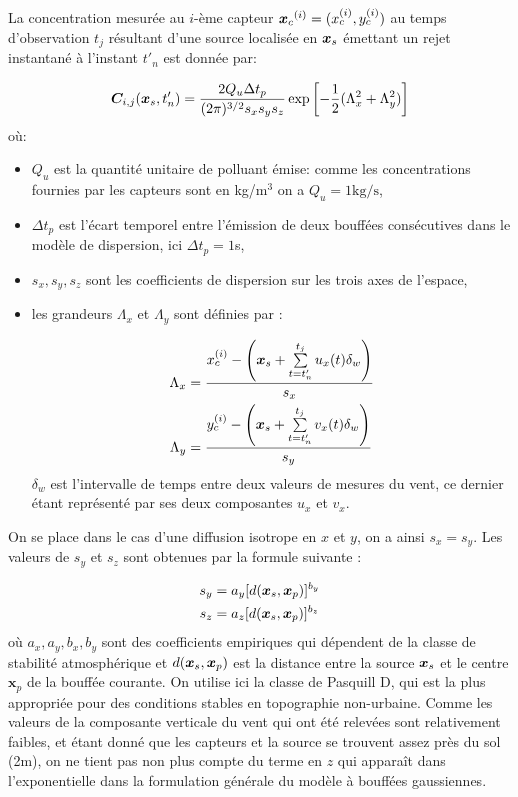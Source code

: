  La concentration mesurée au $i$-ème capteur ${\bm{x}_c}^{(i)} = (x_c^{(i)}, y_c^{(i)})$ au temps d'observation $t_j$ résultant d'une source localisée en ${\bm{x}_s}$ émettant un rejet instantané à l'instant $t'_n$ est donnée par: 
 
 \begin{equation}
 {\bm{C}}_{i,j}({\bm{x}_s}, t'_n) = \dfrac{2Q_u\Delta t_p}{(2\pi)^{3/2}s_x s_y s_z}\exp\left[-\dfrac{1}{2}(\Lambda_x^2 + \Lambda_y^2)\right]
 \label{eq_AE_27}
 \end{equation}
 où:
 \begin{itemize}
 	\item $Q_u$ est la quantité unitaire de polluant émise: comme les concentrations fournies par les capteurs sont en kg/m$^3$ on a $Q_u = 1\text{kg/s}$,
 	\item $\Delta t_p$ est l'écart temporel entre l'émission de deux bouffées consécutives dans le modèle de dispersion, ici $\Delta t_p = 1$s,
 	\item $s_x, s_y, s_z$ sont les coefficients de dispersion sur les trois axes de l'espace,
 	\item les grandeurs $\Lambda_x$ et $\Lambda_y$ sont définies par : 
 	
 	\begin{equation}
 	\begin{split}
 	\Lambda_x &= \dfrac{x_c^{(i)} - \left({\bm{x}_s} + \sum\limits_{t=t'_n}^{t_j}u_x(t)\delta_w\right)}{s_x}\\
 	 	\Lambda_y &= \dfrac{y_c^{(i)} - \left({\bm{x}_s} + \sum\limits_{t=t'_n}^{t_j}v_x(t)\delta_w\right)}{s_y}
 	\end{split}
 	\end{equation}
 	$\delta_w$ est l'intervalle de temps entre deux valeurs de mesures du vent, ce dernier étant représenté par ses deux composantes $u_x$ et $v_x$.
 \end{itemize}
 
 On se place dans le cas d'une diffusion isotrope en $x$ et $y$, on a ainsi $s_x = s_y$. Les valeurs de $s_y$ et $s_z$ sont obtenues par la formule suivante : 
 
 \begin{equation}
 \begin{split}
 s_y &= a_y [d({\bm{x}_s}, \bm{x}_p)]^{b_y}\\
 s_z &= a_z [d({\bm{x}_s}, \bm{x}_p)]^{b_z}
 \end{split}
 \end{equation}
 où $a_x, a_y, b_x, b_y$ sont des coefficients empiriques qui dépendent de la classe de stabilité atmosphérique \cite{Pasquill1983} et $d({\bm{x}_s}, \bm{x}_p)$ est la distance entre la source ${\bm{x}_s}$ et le centre $\bm{x}_p$ de la bouffée courante. On utilise ici la classe de Pasquill D, qui est la plus appropriée pour des conditions stables en topographie non-urbaine. 
 Comme les valeurs de la composante verticale du vent qui ont été relevées sont relativement faibles, et étant donné que les capteurs et la source se trouvent assez près du sol (2m), on ne tient pas non plus compte du terme en $z$ qui apparaît dans l'exponentielle dans la formulation générale du modèle {à bouffées gaussiennes}.

